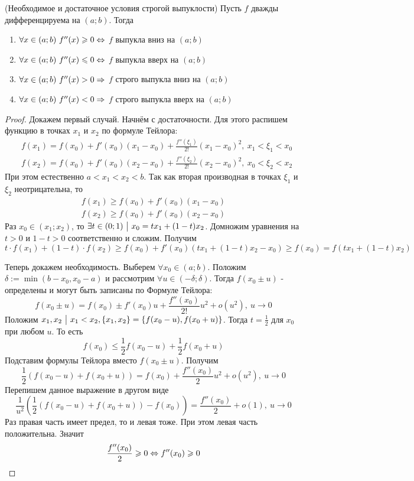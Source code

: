 \begin{theorem} (Необходимое и достаточное условия строгой выпуклости)
	Пусть $f$ дважды дифференцируема на $(a; b)$. Тогда
	\begin{enumerate}
		\item $\forall x \in (a; b)\ f''(x) \geqslant 0 \Leftrightarrow$ $f$ выпукла вниз на $(a; b)$
		
		\item $\forall x \in (a; b)\ f''(x) \leqslant 0 \Leftrightarrow$ $f$ выпукла вверх на $(a; b)$
		
		\item $\forall x \in (a; b)\ f''(x) > 0 \Rightarrow$ $f$ строго выпукла вниз на $(a; b)$
		
		\item $\forall x \in (a; b)\ f''(x) < 0 \Rightarrow$ $f$ строго выпукла вверх на $(a; b)$
	\end{enumerate}
\end{theorem}

\begin{proof}
	Докажем первый случай. Начнём с достаточности. Для этого распишем функцию в точках $x_1$ и $x_2$ по формуле Тейлора:
	\begin{align*}
		&f(x_1) = f(x_0) + f'(x_0)(x_1 - x_0) + \frac{f''(\xi_1)}{2!}(x_1 - x_0)^2,\ x_1 < \xi_1 < x_0
		\\
		&f(x_2) = f(x_0) + f'(x_0)(x_2 - x_0) + \frac{f''(\xi_2)}{2!}(x_2 - x_0)^2,\ x_0 < \xi_2 < x_2
	\end{align*}
	При этом естественно $a < x_1 < x_2 < b$. Так как вторая производная в точках $\xi_1$ и $\xi_2$ неотрицательна, то
	\begin{align*}
		f(x_1) \ge f(x_0) + f'(x_0)(x_1 - x_0)
		\\
		f(x_2) \ge f(x_0) + f'(x_0)(x_2 - x_0)
	\end{align*}
	Раз $x_0 \in (x_1; x_2)$, то $\exists t \in (0; 1) \ \big|\  x_0 = tx_1 + (1 - t)x_2$. Домножим уравнения на $t > 0$ и $1 - t > 0$ соответственно и сложим. Получим
	\[
		t \cdot f(x_1) + (1 - t) \cdot f(x_2) \ge f(x_0) + f'(x_0)\left(tx_1 + (1 - t)x_2 - x_0\right) \ge f(x_0) = f(tx_1 + (1 - t)x_2)
	\]
	
	Теперь докажем необходимость. Выберем $\forall x_0 \in (a; b)$. Положим $\delta := \min(b - x_0, x_0 - a)$ и рассмотрим $\forall u \in (-\delta; \delta)$. Тогда $f(x_0 \pm u)$ - определены и могут быть записаны по Формуле Тейлора:
	\[
		f(x_0 \pm u) = f(x_0) \pm f'(x_0)u + \frac{f''(x_0)}{2!}u^2 + o(u^2),\ u \to 0
	\]
	Положим $x_1, x_2 \ \big|\  x_1 < x_2, \{x_1, x_2\} = \{f(x_0 - u), f(x_0 + u)\}$. Тогда $t = \frac{1}{2}$ для $x_0$ при любом $u$. То есть
	\[
		f(x_0) \le \frac{1}{2}f(x_0 - u) + \frac{1}{2}f(x_0 + u)
	\]
	Подставим формулы Тейлора вместо $f(x_0 \pm u)$. Получим
	\[
		\frac{1}{2}\left(f(x_0 - u) + f(x_0 + u)\right) = f(x_0) + \frac{f''(x_0)}{2}u^2 + o(u^2),\ u \to 0
	\]
	Перепишем данное выражение в другом виде
	\[
		\frac{1}{u^2}\left(\frac{1}{2}\left(f(x_0 - u) + f(x_0 + u)\right) - f(x_0)\right) = \frac{f''(x_0)}{2} + o(1),\ u \to 0
	\]
	Раз правая часть имеет предел, то и левая тоже. При этом левая часть положительна. Значит
	\[
		\frac{f''(x_0)}{2} \geqslant 0 \Leftrightarrow f''(x_0) \geqslant 0
	\]
\end{proof}

